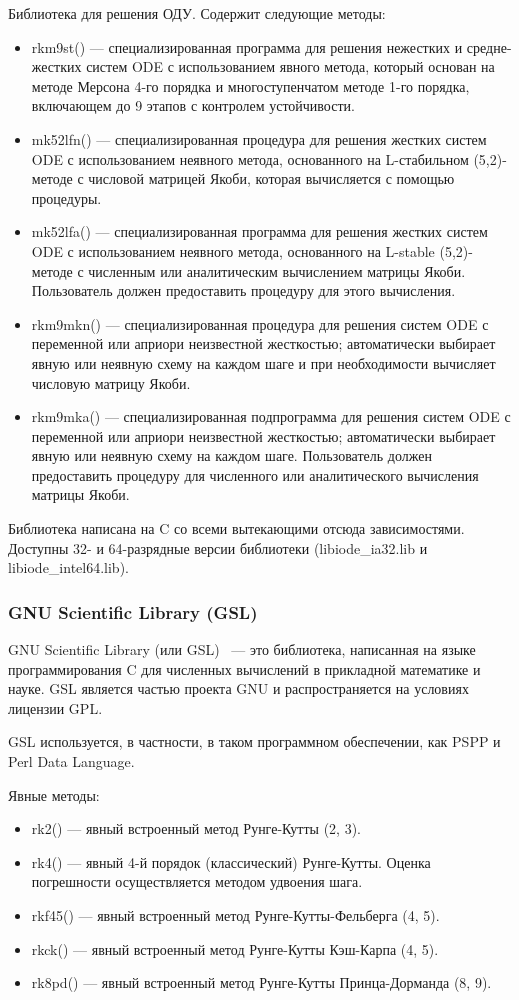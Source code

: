 Библиотека для решения ОДУ. Содержит следующие методы:
\begin{itemize}
    \item rkm9st() — специализированная программа для решения нежестких и средне-жестких систем ODE с использованием явного метода, который основан на методе Мерсона 4-го порядка и многоступенчатом методе 1-го порядка, включающем до 9 этапов с контролем устойчивости.
    \item mk52lfn() — специализированная процедура для решения жестких систем ODE с использованием неявного метода, основанного на L-стабильном (5,2)-методе с числовой матрицей Якоби, которая вычисляется с помощью процедуры.
    \item mk52lfa() — специализированная программа для решения жестких систем ODE с использованием неявного метода, основанного на L-stable (5,2)-методе с численным или аналитическим вычислением матрицы Якоби. Пользователь должен предоставить процедуру для этого вычисления.
    \item rkm9mkn() — специализированная процедура для решения систем ODE с переменной или априори неизвестной жесткостью; автоматически выбирает явную или неявную схему на каждом шаге и при необходимости вычисляет числовую матрицу Якоби.
    \item rkm9mka() — специализированная подпрограмма для решения систем ODE с переменной или априори неизвестной жесткостью; автоматически выбирает явную или неявную схему на каждом шаге. Пользователь должен предоставить процедуру для численного или аналитического вычисления матрицы Якоби.
\end{itemize}

Библиотека написана на C со всеми вытекающими отсюда зависимостями. Доступны 32- и 64-разрядные версии библиотеки (libiode\_ia32.lib и libiode\_intel64.lib).

\subsubsection{GNU Scientific Library (GSL)}

GNU Scientific Library (или GSL) ~--- это библиотека, написанная на языке программирования C для численных вычислений в прикладной математике и науке. GSL является частью проекта GNU и распространяется на условиях лицензии GPL.

GSL используется, в частности, в таком программном обеспечении, как PSPP и Perl Data Language.

Явные методы:
\begin{itemize}
    \item rk2() — явный встроенный метод Рунге-Кутты (2, 3).
    \item rk4() — явный 4-й порядок (классический) Рунге-Кутты. Оценка погрешности осуществляется методом удвоения шага.
    \item rkf45() — явный встроенный метод Рунге-Кутты-Фельберга (4, 5).
    \item rkck() — явный встроенный метод Рунге-Кутты Кэш-Карпа (4, 5).
    \item rk8pd() — явный встроенный метод Рунге-Кутты Принца-Дорманда (8, 9).
\end{itemize}

